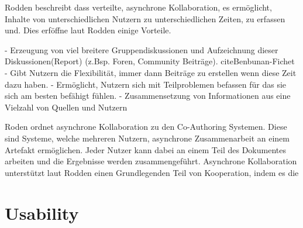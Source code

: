 Rodden \cite{Rodden1992} beschreibt dass verteilte, asynchrone Kollaboration, es ermöglicht, Inhalte von unterschiedlichen Nutzern zu unterschiedlichen Zeiten, zu erfassen und.
Dies erföffne laut Rodden einige Vorteile.

- Erzeugung von viel breitere Gruppendiskussionen und Aufzeichnung dieser Diskussionen(Report) (z.Bsp. Foren, Community Beiträge).\cite{Rodden1992} cite{Benbunan-Fichet} 
- Gibt Nutzern die Flexibilität, immer dann Beiträge zu erstellen wenn diese Zeit dazu haben.
- Ermöglicht, Nutzern sich mit Teilproblemen befassen für das sie sich am besten befähigt fühlen.
- Zusammensetzung von Informationen aus eine Vielzahl von Quellen und Nutzern


Roden \cite{Rodden1992} ordnet asynchrone Kollaboration zu den Co-Authoring Systemen. Diese sind Systeme, welche mehreren Nutzern, asynchrone Zusammenarbeit 
an einem Artefakt ermöglichen. Jeder Nutzer kann dabei an einem Teil des Dokumentes arbeiten und die Ergebnisse werden zusammengeführt. Asynchrone Kollaboration 
unterstützt laut Rodden einen Grundlegenden Teil von Kooperation, indem es die 




\section{Usability}

